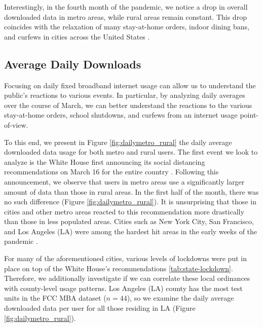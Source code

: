 Interestingly, in the fourth month of the pandemic, we notice a drop in overall downloaded data in metro areas, while rural areas remain constant. This drop coincides with the relaxation of many stay-at-home orders, indoor dining bans, and curfews in cities across the United States \cite{money2020la,gov2020nyc}. 


\subsection{Average Daily Downloads}
Focusing on daily fixed broadband internet usage can allow us to understand the public's reactions to various events. In particular, by analyzing daily averages over the course of March, we can better understand the reactions to the various stay-at-home orders, school shutdowns, and curfews from an internet usage point-of-view. 

To this end, we present in Figure \ref{fig:dailymetro_rural} the daily average downloaded data usage for both metro and rural users. The first event we look to analyze is the White House first announcing its social distancing recommendations on March 16 for the entire country \cite{trump2020coronavirus}. Following this announcement, we observe that users in metro areas use a significantly larger amount of data than those in rural areas. In the first half of the month, there was no such difference (Figure \ref{fig:dailymetro_rural}). It is unsurprising that those in cities and other metro areas reacted to this recommendation more drastically than those in less populated areas. Cities such as New York City, San Francisco, and Los Angeles (LA) were among the hardest hit areas in the early weeks of the pandemic \cite{cdc2020tracker}. 

For many of the aforementioned cities, various levels of lockdowns were put in place on top of the White House's recommendations \ref{tab:state-lockdown}. Therefore, we additionally investigate if we can correlate these local ordinances with county-level usage patterns. Los Angeles (LA) county has the most test units in the FCC MBA dataset ($n=44$), so we examine the daily average downloaded data per user for all those residing in LA (Figure \ref{fig:dailymetro_rural}). 

